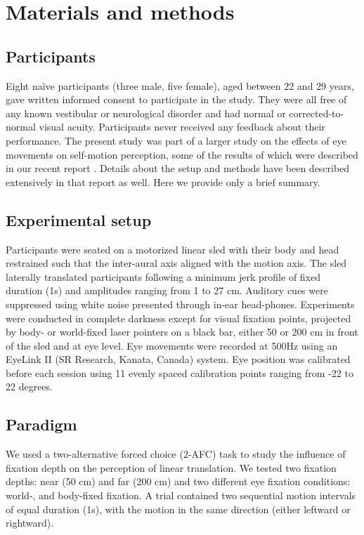 \section{Materials and methods}
\label{p4:sec:methods}

\subsection{Participants}

Eight na\"ive participants (three male, five female), aged between 22 and 29 years, gave written informed consent to participate in the study. They were all free of any known vestibular or neurological disorder and had normal or corrected-to-normal visual acuity. Participants never received any feedback about their performance. The present study was part of a larger study on the effects of eye movements on self-motion perception, some of the results of which were described in our recent report \cite{clemens2015a}. Details about the setup and methods have been described extensively in that report as well. Here we provide only a brief summary.


\subsection{Experimental setup}

Participants were seated on a motorized linear sled with their body and head restrained such that the inter-aural axis aligned with the motion axis. The sled laterally translated participants following a minimum jerk profile of fixed duration (1s) and amplitudes ranging from 1 to 27 \si{\centi\metre}. Auditory cues were suppressed using white noise presented through in-ear head-phones. Experiments were conducted in complete darkness except for visual fixation points, projected by body- or world-fixed laser pointers on a black bar, either 50 or 200 \si{\centi\metre} in front of the sled and at eye level. Eye movements were recorded at 500Hz using an EyeLink II (SR Research, Kanata, Canada) system. Eye position was calibrated before each session using 11 evenly spaced calibration points ranging from -22 to 22 degrees.


\subsection{Paradigm}

We used a two-alternative forced choice (2-AFC) task to study the influence of fixation depth on the perception of linear translation. We tested two fixation depths: near (50 cm) and far (200 \si{\centi\metre}) and two different eye fixation conditions: world-, and body-fixed fixation. A trial contained two sequential motion intervals of equal duration (1s), with the motion in the same direction (either leftward or rightward). 

